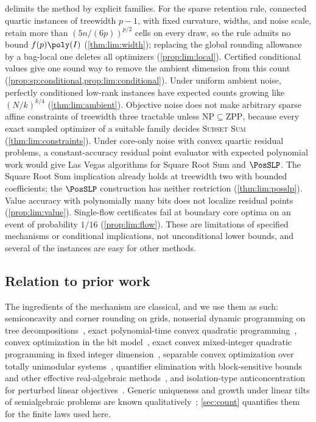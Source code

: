  delimits the method by explicit families. For the sparse
retention rule, connected quartic instances of treewidth $p-1$, with fixed
curvature, widths, and noise scale, retain more than $(5n/(6p))^{p/2}$ cells
on every draw, so the rule admits no bound $f(p)\poly(I)$
(\cref{thm:lim:width}); replacing the global rounding allowance by a bag-local
one deletes all optimizers (\cref{prop:lim:local}). Certified conditional
values give one sound way to remove the ambient dimension from this count
(\cref{prop:sp:conditional,prop:lim:conditional}). Under uniform ambient
noise, perfectly conditioned low-rank instances have expected counts growing
like $(N/k)^{k/4}$ (\cref{thm:lim:ambient}). Objective noise does not make
arbitrary sparse affine constraints of treewidth three tractable unless
$\mathrm{NP}\subseteq\mathrm{ZPP}$, because every exact sampled optimizer of
a suitable family decides \textsc{Subset Sum} (\cref{thm:lim:constraints}).
Under core-only noise with convex quartic
residual problems, a constant-accuracy residual point evaluator with
expected polynomial work would give Las Vegas algorithms for Square Root Sum
and $\PosSLP$. The Square Root Sum implication already holds at treewidth
two with bounded coefficients; the $\PosSLP$ construction has neither
restriction (\cref{thm:lim:posslp}). Value accuracy with polynomially
many bits does not localize residual points (\cref{prop:lim:value}). Single-flow
certificates fail at boundary core optima on an event of probability
$1/16$ (\cref{prop:lim:flow}). These are limitations of specified mechanisms
or conditional implications, not unconditional lower bounds, and several of
the instances are easy for other methods.

\subsection{Relation to prior work}\label{sec:intro:prior}

The ingredients of the mechanism are classical, and we use them as such:
semiconcavity and corner rounding on grids, nonserial dynamic programming on
tree decompositions~\citep{bertele1972-nonserial-dynamic-programming}, exact polynomial-time convex
quadratic programming~\citep{kozlov1980-the-polynomial-solvability-of-convex}, convex optimization
in the bit model~\citep{grotschel1988-geometric-algorithms-and-combinatorial-optimization}, exact convex
mixed-integer quadratic programming in fixed integer
dimension~\citep{pia2025-convex-quadratic-sets-and-the}, separable convex optimization over totally
unimodular systems~\citep{hochbaum1990-convex-separable-optimization-is-not}, quantifier elimination
with block-sensitive bounds~\citep{renegar1992-on-the-computational-complexity-and}
and other effective real-algebraic
methods~\citep{basu2006-algorithms-in-real-algebraic-geometry,basu2021-hausdorff-approximations-and-volume-of}, and isolation-type
anticoncentration for perturbed linear
objectives~\citep{beier2006-typical-properties-of-winners-and,roglin2007-smoothed-analysis-of-integer-programming}. Generic uniqueness
and growth under linear tilts of semialgebraic problems are known
qualitatively~\citep{lee2017-generic-properties-for-semialgebraic-programs}; \cref{sec:count} quantifies them for the
finite laws used here.

